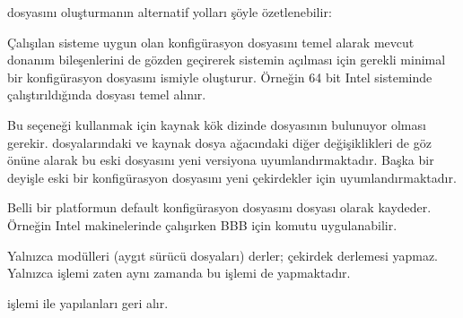 \documentclass[a4paper,10pt,turkish]{sphinxmanual}
\begin{document}
\sphinxAtStartPar
{} dosyasını oluşturmanın alternatif yolları şöyle özetlenebilir:
\begin{description}
\sphinxAtStartPar
Çalışılan sisteme uygun olan konfigürasyon dosyasını temel alarak mevcut donanım bileşenlerini
de gözden geçirerek sistemin açılması için gerekli minimal bir konfigürasyon dosyasını 
ismiyle oluşturur. Örneğin 64 bit Intel sisteminde  çalıştırıldığında
 dosyası temel alınır.

\sphinxAtStartPar
Bu seçeneği kullanmak için kaynak kök dizinde  dosyasının bulunuyor olması gerekir.
 dosyalarındaki ve kaynak dosya ağacındaki diğer değişiklikleri de göz önüne alarak bu
eski  dosyasını yeni versiyona uyumlandırmaktadır. Başka bir deyişle 
eski bir konfigürasyon dosyasını yeni çekirdekler için uyumlandırmaktadır.

\sphinxAtStartPar
Belli bir platformun default konfigürasyon dosyasını  dosyası olarak kaydeder. Örneğin
Intel makinelerinde çalışırken BBB için  komutu uygulanabilir.

\sphinxAtStartPar
Yalnızca modülleri (aygıt sürücü dosyaları) derler; çekirdek derlemesi yapmaz. Yalnızca 
işlemi zaten aynı zamanda bu işlemi de yapmaktadır.

\sphinxAtStartPar
{} işlemi ile yapılanları geri alır.

\end{description}
\end{document}
